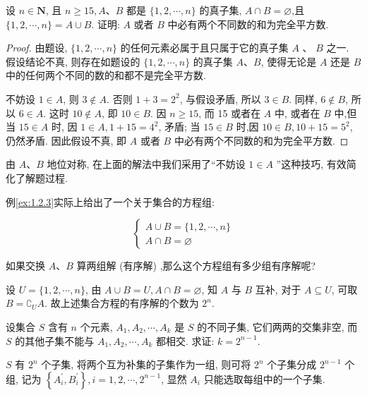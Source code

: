 \begin{example}\label{ex:1.2.3}
设 $n \in \mathbf{N}$, 且 $n \geqslant 15, A 、 B$ 都是 $\{1,2, \cdots, n\}$ 的真子集, $A \cap B=\varnothing$,且 $\{1,2, \cdots, n\}=A \cup B$. 证明: $A$ 或者 $B$ 中必有两个不同数的和为完全平方数.
\end{example}

\begin{proof}
由题设, $\{1,2, \cdots, n\}$ 的任何元素必属于且只属于它的真子集 $A$ 、 $B$ 之一. 假设结论不真, 则存在如题设的 $\{1,2, \cdots, n\}$ 的真子集 $A 、 B$, 使得无论是 $A$ 还是 $B$ 中的任何两个不同的数的和都不是完全平方数.

不妨设 $1 \in A$, 则 $3 \notin A$. 否则 $1+3=2^{2}$, 与假设矛盾, 所以 $3 \in B$. 同样, $6 \notin B$, 所以 $6 \in A$. 这时 $10 \notin A$, 即 $10 \in B$. 因 $n \geqslant 15$, 而 15 或者在 $A$ 中, 或者在 $B$ 中,但当 $15 \in A$ 时, 因 $1 \in A, 1+15=4^{2}$, 矛盾; 当 $15 \in B$ 时,因 $10 \in B, 10+15=5^{2}$, 仍然矛盾. 因此假设不真, 即 $A$ 或者 $B$ 中必有两个不同数的和为完全平方数.
\end{proof}

\begin{note}
由 $A 、 B$ 地位对称, 在上面的解法中我们采用了“不妨设 $1 \in A$ ”这种技巧, 有效简化了解题过程.
\end{note}

例\ref{ex:1.2.3}实际上给出了一个关于集合的方程组:

$$
\left\{\begin{array}{l}
A \cup B=\{1,2, \cdots, n\} \\
A \cap B=\varnothing
\end{array}\right.
$$

如果交换 $A 、 B$ 算两组解 (有序解) ,那么这个方程组有多少组有序解呢?

设 $U=\{1,2, \cdots, n\}$, 由 $A \cup B=U, A \cap B=\varnothing$, 知 $A$ 与 $B$ 互补, 对于 $A \subseteq U$, 可取 $B=\complement_{U} A$. 故上述集合方程的有序解的个数为 $2^{n}$.

\begin{example}
设集合 $S$ 含有 $n$ 个元素, $A_{1}, A_{2}, \cdots, A_{k}$ 是 $S$ 的不同子集, 它们两两的交集非空, 而 $S$ 的其他子集不能与 $A_{1}, A_{2}, \cdots, A_{k}$ 都相交. 求证: $k=2^{n-1}$.
\end{example}

\begin{analysis}
$S$ 有 $2^{n}$ 个子集, 将两个互为补集的子集作为一组, 则可将 $2^{n}$ 个子集分成 $2^{n-1}$ 个组, 记为 $\left\{A_{i}^{\prime}, B_{i}^{\prime}\right\}, i=1,2, \cdots, 2^{n-1}$, 显然 $A_{i}$ 只能选取每组中的一个子集.
\end{analysis}

